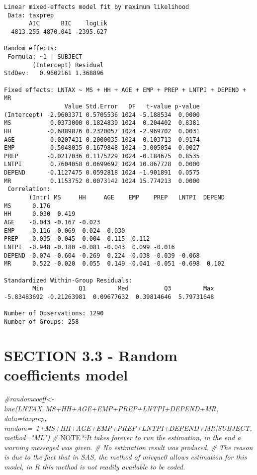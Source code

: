 \documentclass[]{book}
\newenvironment{Shaded}{\begin{snugshade}}{\end{snugshade}}
\newcommand{\AlertTok}[1]{\textcolor[rgb]{0.94,0.16,0.16}{#1}}
\newcommand{\CommentTok}[1]{\textcolor[rgb]{0.56,0.35,0.01}{\textit{#1}}}
\begin{document}
\begin{verbatim}
Linear mixed-effects model fit by maximum likelihood
 Data: taxprep 
       AIC      BIC    logLik
  4813.255 4870.041 -2395.627

Random effects:
 Formula: ~1 | SUBJECT
        (Intercept) Residual
StdDev:   0.9602161 1.368896

Fixed effects: LNTAX ~ MS + HH + AGE + EMP + PREP + LNTPI + DEPEND + MR 
                 Value Std.Error   DF   t-value p-value
(Intercept) -2.9603371 0.5705536 1024 -5.188534  0.0000
MS           0.0373000 0.1824839 1024  0.204402  0.8381
HH          -0.6889876 0.2320057 1024 -2.969702  0.0031
AGE          0.0207431 0.2000035 1024  0.103713  0.9174
EMP         -0.5048035 0.1679848 1024 -3.005054  0.0027
PREP        -0.0217036 0.1175229 1024 -0.184675  0.8535
LNTPI        0.7604058 0.0699692 1024 10.867728  0.0000
DEPEND      -0.1127475 0.0592818 1024 -1.901891  0.0575
MR           0.1153752 0.0073142 1024 15.774213  0.0000
 Correlation: 
       (Intr) MS     HH     AGE    EMP    PREP   LNTPI  DEPEND
MS      0.176                                                 
HH      0.030  0.419                                          
AGE    -0.043 -0.167 -0.023                                   
EMP    -0.116 -0.069  0.024 -0.030                            
PREP   -0.035 -0.045  0.004 -0.115 -0.112                     
LNTPI  -0.948 -0.180 -0.081 -0.043  0.099 -0.016              
DEPEND -0.074 -0.604 -0.269  0.224 -0.038 -0.039 -0.068       
MR      0.522 -0.020  0.055  0.149 -0.041 -0.051 -0.698  0.102

Standardized Within-Group Residuals:
        Min          Q1         Med          Q3         Max 
-5.83483692 -0.21263981  0.09677632  0.39814646  5.79731648 

Number of Observations: 1290
Number of Groups: 258 
\end{verbatim}

\hypertarget{section-3.3---random-coefficients-model}{%
\section{SECTION 3.3 - Random coefficients model}\label{section-3.3---random-coefficients-model}}

\begin{Shaded}
\begin{Highlighting}[]
\CommentTok{#randomcoeff<-lme(LNTAX~MS+HH+AGE+EMP+PREP+LNTPI+DEPEND+MR, data=taxprep, random=~1+MS+HH+AGE+EMP+PREP+LNTPI+DEPEND+MR|SUBJECT, method="ML") }
\CommentTok{# }\AlertTok{NOTE}\CommentTok{*:It takes forever to run the estimation, in the end a warning messaged was given. }
\CommentTok{# No estimation result was produced. }
\CommentTok{# The reason is due to the fact that in SAS, the method of mivque0 allows estimation for this model, in R this method is not readily available to be coded.}
\end{Highlighting}
\end{Shaded}
\end{document}
